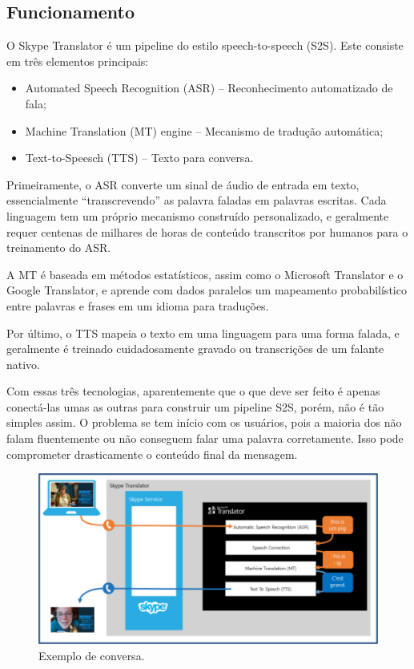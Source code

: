 \documentclass[12pt]{article}
\begin{document}
\subsection{Funcionamento} \label{sec:firstpage}

O Skype Translator é um pipeline do estilo speech-to-speech (S2S). Este consiste em três elementos principais:

\begin{itemize}
	\item Automated Speech Recognition (ASR) – Reconhecimento automatizado de fala;
	\item Machine Translation (MT) engine  – Mecanismo de tradução automática;
	\item Text-to-Speesch (TTS) – Texto para conversa.
\end{itemize}

Primeiramente, o ASR converte um sinal de áudio de entrada em texto, essencialmente “transcrevendo” as palavra faladas em palavras escritas. Cada linguagem tem um próprio mecanismo construído personalizado, e geralmente requer centenas de milhares de horas de conteúdo transcritos por humanos para o treinamento do ASR.

A MT é baseada em métodos estatísticos, assim como o Microsoft Translator e o Google Translator, e aprende com dados paralelos um mapeamento probabilístico entre palavras e frases em um idioma para traduções.

Por último, o TTS mapeia o texto em uma linguagem para uma forma falada, e geralmente é treinado cuidadosamente gravado ou transcrições de um falante nativo.

Com essas três tecnologias, aparentemente que o que deve ser feito é apenas conectá-las umas as outras para construir um pipeline S2S, porém, não é tão simples assim. O problema se tem início com os usuários, pois a maioria dos não falam fluentemente ou não conseguem falar uma palavra corretamente. Isso pode comprometer drasticamente o conteúdo final da mensagem.

\begin{figure}[ht]
	\centering
	\includegraphics[width=.5\textwidth]{imagem1pdsi.jpg}
	\caption{Exemplo de conversa.}
	\label{fig:imagem1pdsi}
\end{figure}
\end{document}
